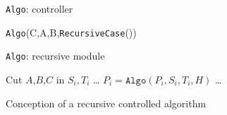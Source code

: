 \begin{figure}[h]
	\vspace{-1em}
	\small
        \hfil
	\begin{minipage}[t]{0.45\textwidth}
                \begin{algorithm}[H]
                        \caption{\texttt{Algo}: controller}
                        \label{alg:controle}
			{
				{\tt Algo}(C,A,B,{\tt RecursiveCase}())
			}
                \end{algorithm}
        \end{minipage}
        \hfil
	\begin{minipage}[t]{0.49\textwidth}
                \begin{algorithm}[H]
                        \DontPrintSemicolon
                        \caption{\texttt{Algo}: recursive module}
                        \label{alg:action}
                        Cut $A$,$B$,$C$ in $S_i, T_i$\;
                        \ldots \;
                        $P_i = \mathtt{Algo}(P_i, S_i,T_i,H)$ \;
                        \ldots \;
                \end{algorithm}
        \end{minipage}
        \hfil
        \caption{Conception of a recursive controlled algorithm}
        \label{fig:seuil}
	\vspace{-2em}
\end{figure}
